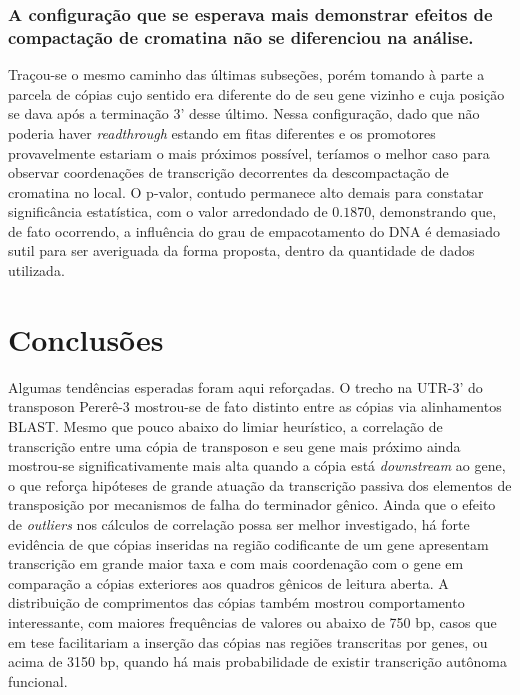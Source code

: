 \documentclass[12pt]{article}
\begin{document}
\begin{multicols}{2}
\subsubsection{A configuração que se esperava mais demonstrar efeitos de compactação de cromatina não se diferenciou na análise.}
Traçou-se o mesmo caminho das últimas subseções, porém tomando à parte a parcela de cópias cujo sentido era diferente do de seu gene vizinho e cuja posição se dava após a terminação 3' desse último. Nessa configuração, dado que não poderia haver \textit{readthrough} estando em fitas diferentes e os promotores provavelmente estariam o mais próximos possível, teríamos o melhor caso para observar coordenações de transcrição decorrentes da descompactação de cromatina no local. O p-valor, contudo permanece alto demais para constatar significância estatística, com o valor arredondado de \(0.1870\), demonstrando que, de fato ocorrendo, a influência do grau de empacotamento do DNA é demasiado sutil para ser averiguada da forma proposta, dentro da quantidade de dados utilizada.

\section{Conclusões}
Algumas tendências esperadas foram aqui reforçadas. O trecho na UTR-3' do transposon Pererê-3 mostrou-se de fato distinto entre as cópias via alinhamentos BLAST. Mesmo que pouco abaixo do limiar heurístico, a correlação de transcrição entre uma cópia de transposon e seu gene mais próximo ainda mostrou-se significativamente mais alta quando a cópia está \textit{downstream} ao gene, o que reforça hipóteses de grande atuação da transcrição passiva dos elementos de transposição por mecanismos de falha do terminador gênico. Ainda que o efeito de \textit{outliers} nos cálculos de correlação possa ser melhor investigado, há forte evidência de que cópias inseridas na região codificante de um gene apresentam transcrição em grande maior taxa e com mais coordenação com o gene em comparação a cópias exteriores aos quadros gênicos de leitura aberta. A distribuição de comprimentos das cópias também mostrou comportamento interessante, com maiores frequências de valores ou abaixo de 750 bp, casos que em tese facilitariam a inserção das cópias nas regiões transcritas por genes, ou acima de 3150 bp, quando há mais probabilidade de existir transcrição autônoma funcional.

\end{multicols}
\end{document}
